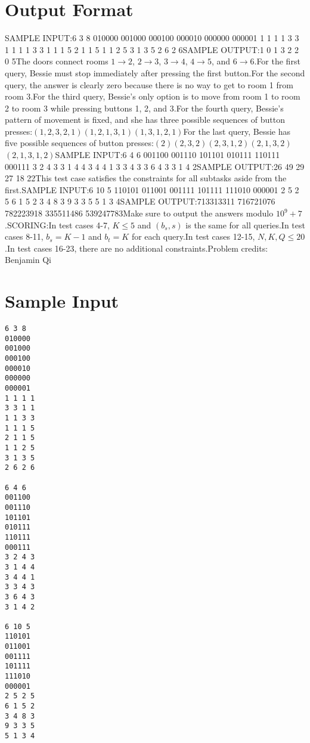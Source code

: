 \documentclass[12pt]{article}
\begin{document}
\section*{Output Format}
SAMPLE INPUT:6 3 8
010000
001000
000100
000010
000000
000001
1 1 1 1
3 3 1 1
1 1 3 3
1 1 1 5
2 1 1 5
1 1 2 5
3 1 3 5
2 6 2 6SAMPLE OUTPUT:1
0
1
3
2
2
0
5The doors connect rooms $1\to 2$, $2 \to 3$, $3\to 4$, $4\to 5$, and $6\to 6$.For the first query, Bessie must stop immediately after pressing the first
button.For the second query, the answer is clearly zero because there is no way to get
to room 1 from room 3.For the third query, Bessie's only option is to move from room 1 to room 2 to
room 3 while pressing buttons 1, 2, and 3.For the fourth query, Bessie's pattern of movement is fixed, and she has three
possible sequences of button presses:$(1,2,3,2,1)$$(1,2,1,3,1)$$(1,3,1,2,1)$For the last query, Bessie has five possible sequences of button presses:$(2)$$(2,3,2)$$(2,3,1,2)$$(2,1,3,2)$$(2,1,3,1,2)$SAMPLE INPUT:6 4 6
001100
001110
101101
010111
110111
000111
3 2 4 3
3 1 4 4
3 4 4 1
3 3 4 3
3 6 4 3
3 1 4 2SAMPLE OUTPUT:26
49
29
27
18
22This test case satisfies the constraints for all subtasks aside from the first.SAMPLE INPUT:6 10 5
110101
011001
001111
101111
111010
000001
2 5 2 5
6 1 5 2
3 4 8 3
9 3 3 5
5 1 3 4SAMPLE OUTPUT:713313311
716721076
782223918
335511486
539247783Make sure to output the answers modulo $10^9+7$.SCORING:In test cases 4-7, $K\le 5$ and $(b_s,s)$ is the same for all queries.In test cases 8-11, $b_s=K-1$ and $b_t=K$ for each query.In test cases 12-15, $N,K,Q\le 20$.In test cases 16-23, there are no additional constraints.Problem credits: Benjamin Qi

\section*{Sample Input}
\begin{verbatim}
6 3 8
010000
001000
000100
000010
000000
000001
1 1 1 1
3 3 1 1
1 1 3 3
1 1 1 5
2 1 1 5
1 1 2 5
3 1 3 5
2 6 2 6

6 4 6
001100
001110
101101
010111
110111
000111
3 2 4 3
3 1 4 4
3 4 4 1
3 3 4 3
3 6 4 3
3 1 4 2

6 10 5
110101
011001
001111
101111
111010
000001
2 5 2 5
6 1 5 2
3 4 8 3
9 3 3 5
5 1 3 4
\end{verbatim}
\end{document}
